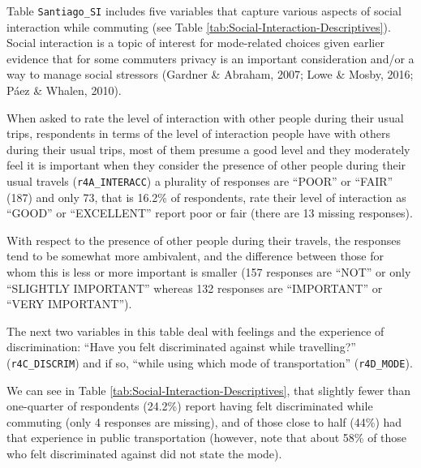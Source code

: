 \documentclass[
11pt, %
oneside, %
english, %
singlespacing, %
]{macthesis} %
\begin{document}
Table \texttt{Santiago\_SI} includes five variables that capture various aspects of social interaction while commuting (see Table \ref{tab:Social-Interaction-Descriptives}). Social interaction is a topic of interest for mode-related choices given earlier evidence that for some commuters privacy is an important consideration and/or a way to manage social stressors (Gardner \& Abraham, 2007; Lowe \& Mosby, 2016; Páez \& Whalen, 2010).

When asked to rate the level of interaction with other people during their usual trips, respondents in terms of the level of interaction people have with others during their usual trips, most of them presume a good level and they moderately feel it is important when they consider the presence of other people during their usual travels (\texttt{r4A\_INTERACC}) a plurality of responses are ``POOR'' or ``FAIR'' (187) and only 73, that is 16.2\% of respondents, rate their level of interaction as ``GOOD'' or ``EXCELLENT'' report poor or fair (there are 13 missing responses).

With respect to the presence of other people during their travels, the responses tend to be somewhat more ambivalent, and the difference between those for whom this is less or more important is smaller (157 responses are ``NOT'' or only ``SLIGHTLY IMPORTANT'' whereas 132 responses are ``IMPORTANT'' or ``VERY IMPORTANT'').

The next two variables in this table deal with feelings and the experience of discrimination: ``Have you felt discriminated against while travelling?'' (\texttt{r4C\_DISCRIM}) and if so, ``while using which mode of transportation'' (\texttt{r4D\_MODE}).

We can see in Table \ref{tab:Social-Interaction-Descriptives}, that slightly fewer than one-quarter of respondents (24.2\%) report having felt discriminated while commuting (only 4 responses are missing), and of those close to half (44\%) had that experience in public transportation (however, note that about 58\% of those who felt discriminated against did not state the mode).
\end{document}
